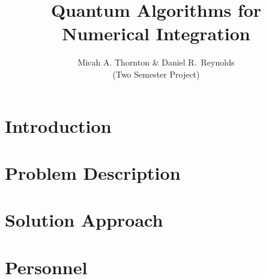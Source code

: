 \documentclass[final]{siamltex}
\title{Quantum Algorithms for Numerical Integration}
\author{Micah A. Thornton \& Daniel R.~Reynolds\\
  (Two Semester Project)
}
\renewcommand{\(}{\left(}
\renewcommand{\)}{\right)}
\begin{document}
\maketitle

\pagestyle{myheadings}
\thispagestyle{plain}


\section{Introduction}
\label{sec:intro}


\section{Problem Description}
\label{sec:problem}


\section{Solution Approach}
\label{sec:solvers}


\section{Personnel}
\label{sec:sam}






\end{document}
